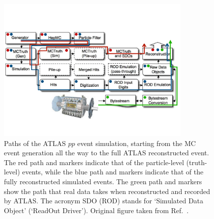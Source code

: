 \begin{figure}[!htb]
    \begin{center}
        \includegraphics[width=0.85\textwidth]{figures/event_simulation/atlas_sim_structure_arrPDF}
        \caption{
            Paths of the ATLAS $pp$ event simulation, starting from the MC event generation all the way
            to the full ATLAS reconstructed event.
            The red path and markers indicate that of the particle-level (truth-level) events,
            while the blue path and markers indicate that of the fully reconstructed simulated events.
            The green path and markers show the path that real data takes when reconstructed and recorded by ATLAS.
            The acronym SDO (ROD) stands for `Simulated Data Object' (`ReadOut Driver').
            Original figure taken from Ref.~\cite{ATLASSim}.
        }
        \label{fig:atlas_sim_structure}
    \end{center}
\end{figure}
